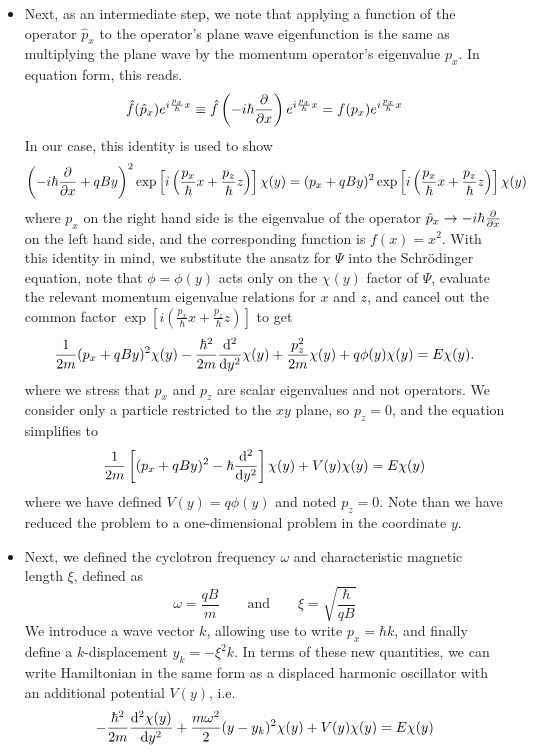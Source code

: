\documentclass[11pt, a4paper]{article}
\newcommand{\eqtext}[1]{\qquad \text{#1} \qquad}
\newcommand{\Schro}{Schr\"{o}dinger\xspace}
\newcommand{\Ham}{Hamiltonian\xspace}
\renewcommand{\P}{\Psi}  %
\begin{document}
\begin{itemize}
	\item Next, as an intermediate step, we note that applying a function of the operator $ \hat{p}_{x} $ to the operator's plane wave eigenfunction is the same as multiplying the plane wave by the momentum operator's eigenvalue $ p_{x} $. In equation form, this reads. 
	\begin{equation*}
		\hat{f}(\hat{p}_{x})e^{i\frac{p_{x}}{\hbar}x} \equiv  \hat{f}\left(-i\hbar \pdv{x}\right)e^{i\frac{p_{x}}{\hbar}x} = f(p_{x}) e^{i\frac{p_{x}}{\hbar}x} 
	\end{equation*}
	In our case, this identity is used to show
	\begin{align*}
		\left(-i\hbar \pdv{x} + qBy\right)^{2}\exp\left[i \left(\frac{p_{x}}{\hbar}x + \frac{p_{z}}{\hbar}z \right)\right]\chi(y) = (p_{x} + qBy)^{2}\exp\left[i \left(\frac{p_{x}}{\hbar}x + \frac{p_{z}}{\hbar}z \right)\right]\chi(y)
	\end{align*}
	where $ p_{x} $ on the right hand side is the eigenvalue of the operator $ \hat{p}_{x} \to -i\hbar \pdv{x}$ on the left hand side, and the corresponding function is $ f(x) = x^{2} $. With this identity in mind, we substitute the ansatz for $ \P $ into the \Schro equation, note that $ \phi = \phi(y) $ acts only on the $ \chi(y) $ factor of $ \P $, evaluate the relevant momentum eigenvalue relations for $ x $ and $ z $, and cancel out the common factor $ \exp\left[i \left(\frac{p_{x}}{\hbar}x + \frac{p_{z}}{\hbar}z \right)\right] $ to get
	\begin{equation*}
		\frac{1}{2m}(p_{x} + qBy)^{2}\chi(y) - \frac{\hbar^{2}}{2m}\dv[2]{}{y}\chi(y) + \frac{p^{2}_{z}}{2m}\chi(y) + q\phi(y)\chi(y) = E\chi(y).
	\end{equation*}
	where we stress that $ p_{x} $ and $ p_{z} $ are scalar eigenvalues and not operators. We consider only a particle restricted to the  $ xy $ plane, so $ p_{z} = 0 $, and the equation simplifies to
	\begin{equation*}
		\frac{1}{2m}\left[(p_{x} + qBy)^{2} - \hbar \dv[2]{}{y}\right]\chi(y) + V(y)\chi(y) = E\chi(y)
	\end{equation*}
	where we have defined $ V(y) = q\phi(y) $ and noted $ p_{z} = 0 $. Note than we have reduced the problem to a one-dimensional problem in the coordinate $ y $. 
	
	\item Next, we defined the cyclotron frequency $  \omega  $ and characteristic magnetic length $ \xi $, defined as
	\begin{equation*}
		\omega = \frac{qB}{m} \eqtext{and} \xi = \sqrt{\frac{\hbar}{qB}}
	\end{equation*}
	We introduce a wave vector $ k $, allowing use to write $ p_{x} = \hbar k $, and finally define a $ k $-displacement $ y_{k} = -\xi^{2}k $. In terms of these new quantities, we can write \Ham in the same form as a displaced harmonic oscillator with an additional potential $ V(y) $, i.e.
	\begin{equation*}
		-\frac{\hbar^{2}}{2m} \dv[2]{\chi(y)}{y} + \frac{m\omega^{2}}{2}(y - y_{k})^{2}\chi(y) + V(y)\chi(y) = E\chi(y)
	\end{equation*}
	

\end{itemize}
\end{document}
